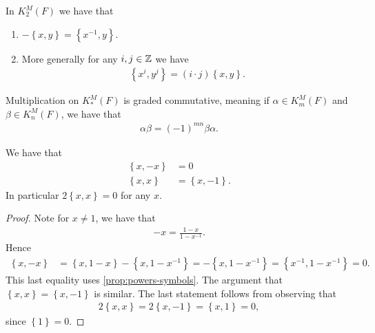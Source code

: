 \documentclass[11pt,openany]{book}
\begin{document}
\begin{proposition}\label{prop:powers-symbols} 
In $K_2^M(F)$ we have that
\begin{enumerate}
    \item $-\left\{ x,y \right\} = \left\{ x^{-1},y \right\}$.
    \item More generally for any $i,j\in \mathbb{Z}$ we have
    \begin{align*}
         \left\{ x^i,y^j \right\} = (i\cdot j) \left\{ x,y \right\}.
    \end{align*}
\end{enumerate}
\end{proposition}


\begin{proposition} \cite[1.1]{MilnorK}
Multiplication on $K_\ast^M(F)$ is graded commutative, meaning if $\alpha \in K_m^M(F)$ and $\beta \in K_n^M(F)$, we have that
\begin{align*}
    \alpha\beta = (-1)^{mn}\beta\alpha.
\end{align*}
\end{proposition}

\begin{proposition}\label{prop:KM2-relations} 
\cite[1.1,~1.2]{MilnorK}
We have that
\begin{align*}
    \left\{ x,-x \right\} &= 0 \\
    \left\{ x,x \right\} &= \left\{ x,-1 \right\}.
\end{align*}
In particular $2\left\{ x,x \right\} = 0$ for any $x$.
\end{proposition}
\begin{proof} Note for $x\ne 1$, we have that
\begin{align*}
    -x = \frac{1-x}{ 1- x^{-1}}.
\end{align*}
%
Hence 
\begin{align*}
    \left\{ x,-x \right\} &= \left\{ x,1-x \right\} - \left\{ x, 1-x^{-1} \right\} = -\left\{ x, 1- x^{-1} \right\} = \left\{x^{-1}, 1-x^{-1} \right\} = 0.
\end{align*}
This last equality uses \autoref{prop:powers-symbols}.
The argument that $\left\{ x,x \right\} = \left\{ x,-1 \right\}$ is similar.
The last statement follows from observing that
\begin{align*}
    2\left\{ x,x \right\} = 2 \left\{ x, -1 \right\} = \left\{ x, 1 \right\} = 0,
\end{align*}
since $\left\{ 1 \right\} = 0$.
\end{proof}
\end{document}
